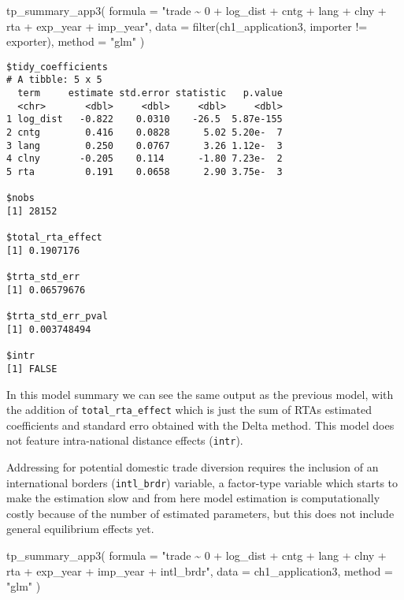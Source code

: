 \documentclass[12pt,reqno,oneside,pdftex]{formato-puc/puctesis} %
\newenvironment{Shaded}{\begin{snugshade}}{\end{snugshade}}
\newcommand{\AttributeTok}[1]{\textcolor[rgb]{0.77,0.63,0.00}{#1}}
\newcommand{\FunctionTok}[1]{\textcolor[rgb]{0.00,0.00,0.00}{#1}}
\newcommand{\NormalTok}[1]{#1}
\newcommand{\SpecialCharTok}[1]{\textcolor[rgb]{0.00,0.00,0.00}{#1}}
\newcommand{\StringTok}[1]{\textcolor[rgb]{0.31,0.60,0.02}{#1}}
\begin{document}
\begin{Shaded}
\begin{Highlighting}[]
\FunctionTok{tp\_summary\_app3}\NormalTok{(}
  \AttributeTok{formula =} \StringTok{"trade \textasciitilde{} 0 + log\_dist + cntg + lang + clny +}
\StringTok{    rta + exp\_year + imp\_year"}\NormalTok{,}
  \AttributeTok{data =} \FunctionTok{filter}\NormalTok{(ch1\_application3, importer }\SpecialCharTok{!=}\NormalTok{ exporter),}
  \AttributeTok{method =} \StringTok{"glm"}
\NormalTok{)}
\end{Highlighting}
\end{Shaded}

\begin{verbatim}
$tidy_coefficients
# A tibble: 5 x 5
  term     estimate std.error statistic   p.value
  <chr>       <dbl>     <dbl>     <dbl>     <dbl>
1 log_dist   -0.822    0.0310    -26.5  5.87e-155
2 cntg        0.416    0.0828      5.02 5.20e-  7
3 lang        0.250    0.0767      3.26 1.12e-  3
4 clny       -0.205    0.114      -1.80 7.23e-  2
5 rta         0.191    0.0658      2.90 3.75e-  3

$nobs
[1] 28152

$total_rta_effect
[1] 0.1907176

$trta_std_err
[1] 0.06579676

$trta_std_err_pval
[1] 0.003748494

$intr
[1] FALSE
\end{verbatim}

In this model summary we can see the same output as the previous model,
with the addition of \texttt{total\_rta\_effect} which is just the sum
of RTAs estimated coefficients and standard erro obtained with the Delta
method. This model does not feature intra-national distance effects
(\texttt{intr}).

Addressing for potential domestic trade diversion requires the inclusion
of an international borders (\texttt{intl\_brdr}) variable, a
factor-type variable which starts to make the estimation slow and from
here model estimation is computationally costly because of the number of
estimated parameters, but this does not include general equilibrium
effects yet.

\begin{Shaded}
\begin{Highlighting}[]
\FunctionTok{tp\_summary\_app3}\NormalTok{(}
  \AttributeTok{formula =} \StringTok{"trade \textasciitilde{} 0 + log\_dist + cntg + lang + clny +}
\StringTok{    rta + exp\_year + imp\_year + intl\_brdr"}\NormalTok{,}
  \AttributeTok{data =}\NormalTok{ ch1\_application3,}
  \AttributeTok{method =} \StringTok{"glm"}
\NormalTok{)}
\end{Highlighting}
\end{Shaded}
\end{document}
